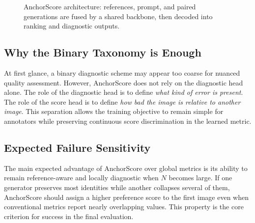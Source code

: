 \begin{figure}[t]
\centering
{}
\caption{AnchorScore architecture: references, prompt, and paired generations are fused by a shared backbone, then decoded into ranking and diagnostic outputs.}
\label{fig:anchorscore_overview}
\end{figure}

\subsection{Why the Binary Taxonomy is Enough}
At first glance, a binary diagnostic scheme may appear too coarse for nuanced quality assessment. However, AnchorScore does not rely on the diagnostic head alone. The role of the diagnostic head is to define \emph{what kind of error is present}. The role of the score head is to define \emph{how bad the image is relative to another image}. This separation allows the training objective to remain simple for annotators while preserving continuous score discrimination in the learned metric.

\subsection{Expected Failure Sensitivity}
The main expected advantage of AnchorScore over global metrics is its ability to remain reference-aware and locally diagnostic when $N$ becomes large. If one generator preserves most identities while another collapses several of them, AnchorScore should assign a higher preference score to the first image even when conventional metrics report nearly overlapping values. This property is the core criterion for success in the final evaluation.
